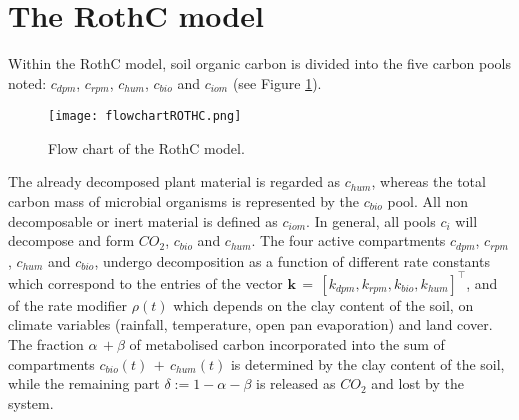 \section{The RothC model}
\label{sec:1}
Within the RothC model, soil organic carbon   is divided into the five carbon pools noted: $c_{dpm}$, $c_{rpm}$, $c_{hum}$, $c_{bio}$ and $c_{iom}$ (see Figure \ref{fig:1}).
\begin{figure}
\begin{center}
\texttt{[image: flowchartROTHC.png]} 
\caption{\small  Flow chart of the RothC model.} 
\label{fig:1}
\end{center}
\end{figure}
The already decomposed plant material is regarded as $c_{hum}$, whereas the total carbon mass of microbial organisms is represented by the $c_{bio}$ pool. All non decomposable or inert material is defined as $c_{iom}$. In general, all pools $c_{i}$ will decompose and form $CO_2$, $c_{bio}$ and $c_{hum}$.  The four active compartments  $c_{dpm}$, $c_{rpm}$, $c_{hum}$ and $c_{bio}$,  undergo decomposition as a function of different rate constants which correspond to the entries of the vector $\mathbf{k}\,=\, [k_{dpm},k_{rpm},k_{bio},k_{hum}]^\intercal$, and of the rate modifier $\rho(t)$ which depends on the clay content of the soil, on climate variables (rainfall, temperature, open pan evaporation) and land cover.  The fraction $\alpha\,+\beta$ of metabolised carbon incorporated into the sum of compartments $ c_{bio}(t)\, +\,c_{hum}(t)$ is determined by the clay content of the soil, while the remaining part $\delta:= 1-\alpha-\beta$ is 
released as $CO_2$ and lost by the system.

